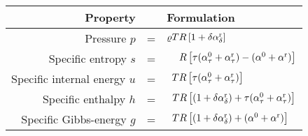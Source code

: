 \begin{tabularx}{\linewidth}{rcl}
\toprule
Property & & Formulation \\
\midrule
Pressure $p$  &=& $\varrho TR\left[
1+\delta \ard
\right]$ \\[5pt]
Specific entropy $s$  &=& $\phantom{T \varrho} R \left[
 \tau(\ait+\art) - (\ai + \ar)
\right]$ \\[5pt]
Specific internal energy $u$ &=& $\phantom{\varrho} TR \left[
\tau(\ait+\art)
\right]$ \\[5pt]
Specific enthalpy $h$   &=& $\phantom{\varrho} TR \left[
(1+\delta \ard) + \tau(\ait+\art)
\right]$ \\[5pt]
Specific Gibbs-energy $g$  &=& $\phantom{\varrho} TR \left[
 (1+\delta\ard) + (\ai + \ar) 
\right]$ \\[5pt]
\bottomrule
\end{tabularx}%
